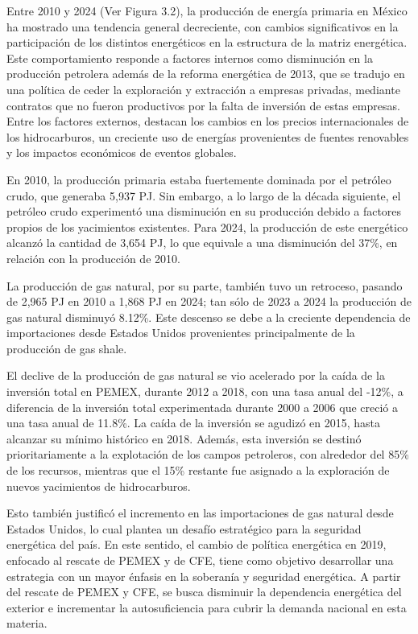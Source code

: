 \documentclass{sener2025}
\begin{document}
Entre 2010 y 2024 (Ver Figura 3.2), la producción de energía primaria en México ha mostrado una tendencia general decreciente, con cambios significativos en la participación de los distintos energéticos en la estructura de la matriz energética. Este comportamiento responde a factores internos como disminución en la producción petrolera además de la reforma energética de 2013, que se tradujo en una política de ceder la exploración y extracción a empresas privadas, mediante contratos que no fueron productivos por la falta de inversión de estas empresas. Entre los factores externos, destacan los cambios en los precios internacionales de los hidrocarburos, un creciente uso de energías provenientes de fuentes renovables y los impactos económicos de eventos globales.

En 2010, la producción primaria estaba fuertemente dominada por el petróleo crudo, que generaba 5,937 PJ. Sin embargo, a lo largo de la década siguiente, el petróleo crudo experimentó una disminución en su producción debido a factores propios de los yacimientos existentes. Para 2024, la producción de este energético alcanzó la cantidad de 3,654 PJ, lo que equivale a una disminución del 37\%, en relación con la producción de 2010.

La producción de gas natural, por su parte, también tuvo un retroceso, pasando de 2,965 PJ en 2010 a 1,868 PJ en 2024; tan sólo de 2023 a 2024 la producción de gas natural disminuyó 8.12\%. Este descenso se debe a la creciente dependencia de importaciones desde Estados Unidos provenientes principalmente de la producción de gas shale.

El declive de la producción de gas natural se vio acelerado por la caída de la inversión total en PEMEX, durante 2012 a 2018, con una tasa anual del -12\%, a diferencia de la inversión total experimentada durante 2000 a 2006 que creció a una tasa anual de 11.8\%. La caída de la inversión se agudizó en 2015, hasta alcanzar su mínimo histórico en 2018. Además, esta inversión se destinó prioritariamente a la explotación de los campos petroleros, con alrededor del 85\% de los recursos, mientras que el 15\% restante fue asignado a la exploración de nuevos yacimientos de hidrocarburos.

Esto también justificó el incremento en las importaciones de gas natural desde Estados Unidos, lo cual plantea un desafío estratégico para la seguridad energética del país. En este sentido, el cambio de política energética en 2019, enfocado al rescate de PEMEX y de CFE, tiene como objetivo desarrollar una estrategia con un mayor énfasis en la soberanía y seguridad energética. A partir del rescate de PEMEX y CFE, se busca disminuir la dependencia energética del exterior e incrementar la autosuficiencia para cubrir la demanda nacional en esta materia.
\end{document}
